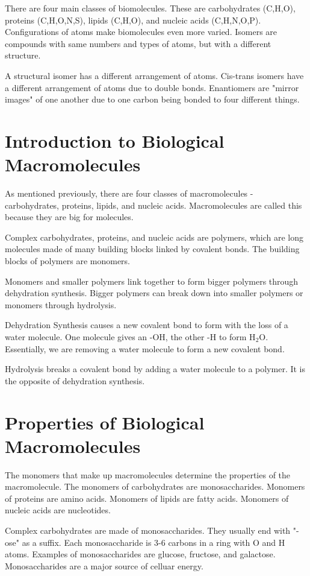 \documentclass[../bio.tex]{subfiles}
\begin{document}
There are four main classes of biomolecules. These are carbohydrates (C,H,O), proteins (C,H,O,N,S), lipids (C,H,O), and nucleic acids (C,H,N,O,P). Configurations of atoms make biomolecules even more varied. Isomers are compounds with same numbers and types of atoms, but with a different structure. 

A structural isomer has a different arrangement of atoms. Cis-trans isomers have a different arrangement of atoms due to double bonds. Enantiomers are "mirror images" of one another due to one carbon being bonded to four different things.   
\section{Introduction to Biological Macromolecules}
As mentioned previously, there are four classes of macromolecules - carbohydrates, proteins, lipids, and nucleic acids. Macromolecules are called this because they are big for molecules.

Complex carbohydrates, proteins, and nucleic acids are polymers, which are long molecules made of many building blocks linked by covalent bonds. The building blocks of polymers are monomers.

Monomers and smaller polymers link together to form bigger polymers through dehydration synthesis. Bigger polymers can break down into smaller polymers or monomers through hydrolysis. 

Dehydration Synthesis causes a new covalent bond to form with the loss of a water molecule. One molecule gives an -OH, the other -H to form H$_2$O. Essentially, we are removing a water molecule to form a new covalent bond.

Hydrolysis breaks a covalent bond by adding a water molecule to a polymer. It is the opposite of dehydration synthesis.
\section{Properties of Biological Macromolecules}
The monomers that make up macromolecules determine the properties of the macromolecule. The monomers of carbohydrates are monosaccharides. Monomers of proteins are amino acids. Monomers of lipids are fatty acids. Monomers of nucleic acids are nucleotides.

Complex carbohydrates are made of monosaccharides. They usually end with "-ose" as a suffix. Each monosaccharide is 3-6 carbons in a ring with O and H atoms. Examples of monosaccharides are glucose, fructose, and galactose. Monosaccharides are a major source of celluar energy. 
\end{document}
